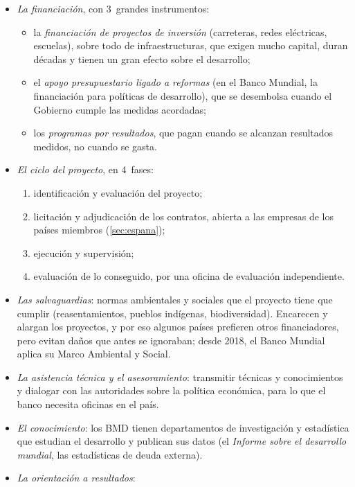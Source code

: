 \documentclass[11pt]{article}
\begin{document}
\begin{itemize}
\item \emph{La financiación}, con 3~grandes instrumentos:
  \begin{itemize}
  \item la \emph{financiación de proyectos de inversión} (carreteras, redes eléctricas, escuelas), sobre todo de infraestructuras, que exigen mucho capital, duran décadas y tienen un gran efecto sobre el desarrollo;
  \item el \emph{apoyo presupuestario ligado a reformas} (en el Banco Mundial, la financiación para políticas de desarrollo), que se desembolsa cuando el Gobierno cumple las medidas acordadas;
  \item los \emph{programas por resultados}, que pagan cuando se alcanzan resultados medidos, no cuando se gasta.
  \end{itemize}
\item \emph{El ciclo del proyecto}, en 4~fases:
  \begin{enumerate}
  \item identificación y evaluación del proyecto;
  \item licitación y adjudicación de los contratos, abierta a las empresas de los países miembros (\ref{sec:espana});
  \item ejecución y supervisión;
  \item evaluación de lo conseguido, por una oficina de evaluación independiente.
  \end{enumerate}
\item \emph{Las salvaguardias}: normas ambientales y sociales que el proyecto tiene que cumplir (reasentamientos, pueblos indígenas, biodiversidad). Encarecen y alargan los proyectos, y por eso algunos países prefieren otros financiadores, pero evitan daños que antes se ignoraban; desde 2018, el Banco Mundial aplica su Marco Ambiental y Social\nocite{BM2017MarcoAmbiental}.
\item \emph{La asistencia técnica y el asesoramiento}: transmitir técnicas y conocimientos y dialogar con las autoridades sobre la política económica, para lo que el banco necesita oficinas en el país.
\item \emph{El conocimiento}: los BMD tienen departamentos de investigación y estadística que estudian el desarrollo y publican sus datos (el \emph{Informe sobre el desarrollo mundial}, las estadísticas de deuda externa).
\item \emph{La orientación a resultados}:
  \begin{itemize}

\end{itemize}
\end{itemize}
\end{document}
